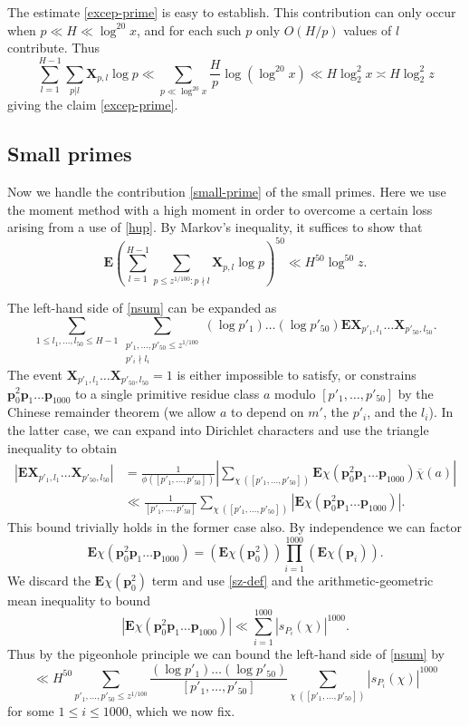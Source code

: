 \documentclass[12pt]{amsart}
\newcommand{\E}{\mathbf{E}}
\begin{document}
The estimate \eqref{excep-prime} is easy to establish.  This contribution can only occur when $p \ll H \ll \log^{20} x$, and for each such $p$ only $O(H/p)$ values of $l$ contribute. Thus
$$\sum_{l=1}^{H-1} \sum_{p | l} \mathbf{X}_{p,l} \log p \ll  \sum_{p \ll \log^{20} x} \frac{H}{p} \log(\log^{20} x) \ll H \log_2^2 x \asymp H \log_2^2 z$$
giving the claim \eqref{excep-prime}.

\subsection{Small primes}

Now we handle the contribution \eqref{small-prime} of the small primes.  Here we use the moment method with a high moment in order to overcome a certain loss arising from a use of \eqref{hup}.  By Markov's inequality, it suffices to show that
\begin{equation}\label{nsum}
 \E \left( \sum_{l=1}^{H-1} \sum_{p \leq z^{1/100}: p \nmid l} \mathbf{X}_{p,l} \log p \right)^{50} \ll H^{50} \log^{50} z.
\end{equation}


The left-hand side of \eqref{nsum} can be expanded as
$$ \sum_{1 \leq l_1,\dots,l_{50} \leq H-1} \sum_{\substack{p'_1,\dots,p'_{50} \leq z^{1/100} \\ p'_i \nmid l_i}} (\log p'_1) \dots (\log p'_{50}) \E \mathbf{X}_{p'_1,l_1} \dots \mathbf{X}_{p'_{50},l_{50}}.$$
The event $\mathbf{X}_{p'_1,l_1} \dots \mathbf{X}_{p'_{50},l_{50}}=1$ is either impossible to satisfy, or constrains $\mathbf{p}_{0}^2 \mathbf{p}_{1} \dots \mathbf{p}_{1000}$ to a single primitive residue class $a$ modulo $[p'_1,\dots,p'_{50}]$ by the Chinese remainder theorem (we allow $a$ to depend on $m'$, the $p'_i$, and the $l_i$).  In the latter case, we can expand  into Dirichlet characters and use the triangle inequality to obtain
\begin{align*}
|\E \mathbf{X}_{p'_1,l_1} \dots \mathbf{X}_{p'_{50},l_{50}}| &=
\frac{1}{\phi([p'_1,\dots,p'_{50}])} \left|\sum_{\chi\ ([p'_1,\dots,p'_{50}])} \E \chi(\mathbf{p}_0^2 \mathbf{p}_1 \dots \mathbf{p}_{1000}) \overline{\chi}(a)\right| \\
&\ll \frac{1}{[p'_1,\dots,p'_{50}]} \sum_{\chi\ ([p'_1,\dots,p'_{50}])} |\E \chi(\mathbf{p}_0^2 \mathbf{p}_1 \dots \mathbf{p}_{1000})|.
\end{align*}
This bound trivially holds in the former case also.
By independence we can factor
$$\E \chi(\mathbf{p}_0^2 \mathbf{p}_1 \dots \mathbf{p}_{1000}) = (\E \chi(\mathbf{p}_0^2)) \prod_{i=1}^{1000} (\E \chi(\mathbf{p}_i)).$$
We discard the $\E \chi(\mathbf{p}_0^2)$ term and use \eqref{sz-def} and the arithmetic-geometric mean inequality to bound
\begin{equation}\label{amgm}
|\E \chi(\mathbf{p}_0^2 \mathbf{p}_1 \dots \mathbf{p}_{1000})|  \ll \sum_{i=1}^{1000} |s_{P_i}(\chi)|^{1000}.
\end{equation}
Thus by the pigeonhole principle we can bound the left-hand side of \eqref{nsum} by
$$ \ll H^{50} \sum_{p'_1,\dots,p'_{50} \leq z^{1/100}} \frac{(\log p'_1) \dots (\log p'_{50})}{[p'_1,\dots,p'_{50}]} \sum_{\chi\ ([p'_1,\dots,p'_{50}])} |s_{P_i}(\chi)|^{1000}$$
for some $1 \leq i \leq 1000$, which we now fix.
\end{document}
